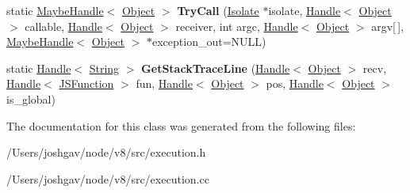 \begin{DoxyCompactItemize}
\item 
static \hyperlink{classv8_1_1internal_1_1_maybe_handle}{Maybe\+Handle}$<$ \hyperlink{classv8_1_1internal_1_1_object}{Object} $>$ {\bfseries Try\+Call} (\hyperlink{classv8_1_1internal_1_1_isolate}{Isolate} $\ast$isolate, \hyperlink{classv8_1_1internal_1_1_handle}{Handle}$<$ \hyperlink{classv8_1_1internal_1_1_object}{Object} $>$ callable, \hyperlink{classv8_1_1internal_1_1_handle}{Handle}$<$ \hyperlink{classv8_1_1internal_1_1_object}{Object} $>$ receiver, int argc, \hyperlink{classv8_1_1internal_1_1_handle}{Handle}$<$ \hyperlink{classv8_1_1internal_1_1_object}{Object} $>$ argv\mbox{[}$\,$\mbox{]}, \hyperlink{classv8_1_1internal_1_1_maybe_handle}{Maybe\+Handle}$<$ \hyperlink{classv8_1_1internal_1_1_object}{Object} $>$ $\ast$exception\+\_\+out=N\+U\+LL)\hypertarget{classv8_1_1internal_1_1_execution_ae8f3a48bd5e56edd2226863f2085d8f3}{}\label{classv8_1_1internal_1_1_execution_ae8f3a48bd5e56edd2226863f2085d8f3}

\item 
static \hyperlink{classv8_1_1internal_1_1_handle}{Handle}$<$ \hyperlink{classv8_1_1internal_1_1_string}{String} $>$ {\bfseries Get\+Stack\+Trace\+Line} (\hyperlink{classv8_1_1internal_1_1_handle}{Handle}$<$ \hyperlink{classv8_1_1internal_1_1_object}{Object} $>$ recv, \hyperlink{classv8_1_1internal_1_1_handle}{Handle}$<$ \hyperlink{classv8_1_1internal_1_1_j_s_function}{J\+S\+Function} $>$ fun, \hyperlink{classv8_1_1internal_1_1_handle}{Handle}$<$ \hyperlink{classv8_1_1internal_1_1_object}{Object} $>$ pos, \hyperlink{classv8_1_1internal_1_1_handle}{Handle}$<$ \hyperlink{classv8_1_1internal_1_1_object}{Object} $>$ is\+\_\+global)\hypertarget{classv8_1_1internal_1_1_execution_ad9bc6c62531c9fc648a1851fc388c57b}{}\label{classv8_1_1internal_1_1_execution_ad9bc6c62531c9fc648a1851fc388c57b}

\end{DoxyCompactItemize}


The documentation for this class was generated from the following files\+:\begin{DoxyCompactItemize}
\item 
/\+Users/joshgav/node/v8/src/execution.\+h\item 
/\+Users/joshgav/node/v8/src/execution.\+cc\end{DoxyCompactItemize}
